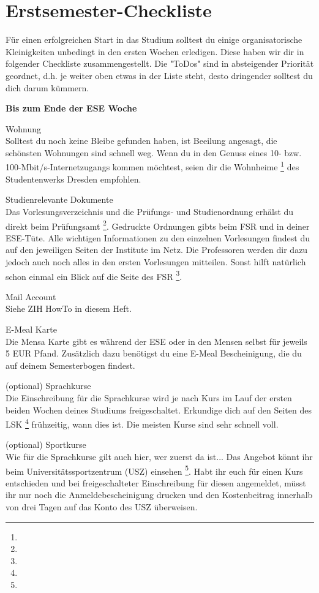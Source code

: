 \chapter{Erstsemester-Checkliste}

Für einen erfolgreichen Start in das Studium solltest du einige organisatorische Kleinigkeiten unbedingt in den ersten Wochen erledigen.
Diese haben wir dir in folgender Checkliste zusammengestellt.
Die "ToDos" sind in absteigender Priorität geordnet, d.h. je weiter oben etwas in der Liste steht, desto dringender solltest du dich darum kümmern.

\textbf{Bis zum Ende der ESE Woche}

Wohnung \\
Solltest du noch keine Bleibe gefunden haben, ist Beeilung angesagt, die schönsten Wohnungen sind schnell weg.
Wenn du in den Genuss eines 10- bzw. 100-Mbit/s-Internetzugangs kommen möchtest, seien dir die Wohnheime \footnote{} des Studentenwerks Dresden empfohlen.

Studienrelevante Dokumente \\
Das Vorlesungsverzeichnis und die Prüfungs- und Studienordnung erhälst du direkt beim Prüfungsamt \footnote{}.
Gedruckte Ordnungen gibts beim FSR und in deiner ESE-Tüte.
Alle wichtigen Informationen zu den einzelnen Vorlesungen findest du auf den jeweiligen Seiten der Institute im Netz.
Die Professoren werden dir dazu jedoch auch noch alles in den ersten Vorlesungen mitteilen. Sonst hilft natürlich schon einmal ein Blick auf die Seite des FSR \footnote{}.

Mail Account \\
Siehe ZIH HowTo in diesem Heft.

E-Meal Karte \\
Die Mensa Karte gibt es während der ESE oder in den Mensen selbst für jeweils 5 EUR Pfand.
Zusätzlich dazu benötigst du eine E-Meal Bescheinigung, die du auf deinem Semesterbogen findest.

(optional) Sprachkurse \\
Die Einschreibung für die Sprachkurse wird je nach Kurs im Lauf der ersten beiden Wochen deines Studiums freigeschaltet.
Erkundige dich auf den Seiten des LSK \footnote{} frühzeitig, wann dies ist. Die meisten Kurse sind sehr schnell voll.

(optional) Sportkurse \\
Wie für die Sprachkurse gilt auch hier, wer zuerst da ist...
Das Angebot könnt ihr beim Universitätssportzentrum (USZ) einsehen \footnote{}.
Habt ihr euch für einen Kurs entschieden und bei freigeschalteter Einschreibung für diesen angemeldet, müsst ihr nur noch die Anmeldebescheinigung drucken und den Kostenbeitrag innerhalb von drei Tagen auf das Konto des USZ überweisen.

